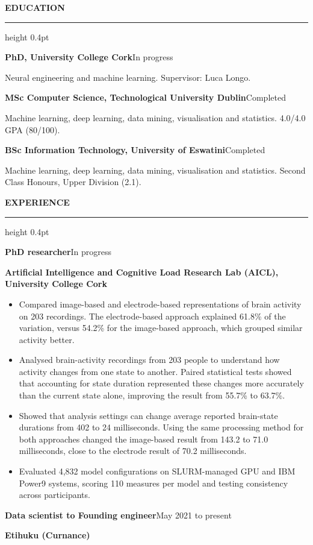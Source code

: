 \documentclass[11pt]{article}
\newcommand{\cvsection}[1]{%
  \par\vspace{5pt}%
  {\fontsize{11.5pt}{13pt}\selectfont\bfseries\MakeUppercase{#1}\par}%
  \nobreak\vspace{2pt}\hrule height 0.4pt\nobreak\vspace{2pt}%
}
\newcommand{\cventry}[2]{\noindent\textbf{#1}\hfill #2\par}
\begin{document}
\cvsection{Education}
\cventry{PhD, University College Cork}{In progress}
Neural engineering and machine learning. Supervisor: Luca Longo.\par
\vspace{2pt}
\cventry{MSc Computer Science, Technological University Dublin}{Completed}
Machine learning, deep learning, data mining, visualisation and statistics. 4.0/4.0 GPA (80/100).\par
\vspace{2pt}
\cventry{BSc Information Technology, University of Eswatini}{Completed}
Machine learning, deep learning, data mining, visualisation and statistics. Second Class Honours, Upper Division (2.1).\par

\enlargethispage{2\baselineskip}
\cvsection{Experience}
\cventry{PhD researcher}{In progress}
\textbf{Artificial Intelligence and Cognitive Load Research Lab (AICL), University College Cork}\par
\begin{itemize}
  \item Compared image-based and electrode-based representations of brain activity on 203 recordings. The electrode-based approach explained 61.8\% of the variation, versus 54.2\% for the image-based approach, which grouped similar activity better.
  \item Analysed brain-activity recordings from 203 people to understand how activity changes from one state to another. Paired statistical tests showed that accounting for state duration represented these changes more accurately than the current state alone, improving the result from 55.7\% to 63.7\%.
  \item Showed that analysis settings can change average reported brain-state durations from 402 to 24 milliseconds. Using the same processing method for both approaches changed the image-based result from 143.2 to 71.0 milliseconds, close to the electrode result of 70.2 milliseconds.
  \item Evaluated 4,832 model configurations on SLURM-managed GPU and IBM Power9 systems, scoring 110 measures per model and testing consistency across participants.
\end{itemize}
\vspace{2pt}
\cventry{Data scientist to Founding engineer}{May 2021 to present}
\textbf{Etihuku (Curnance)}\par
\end{document}
